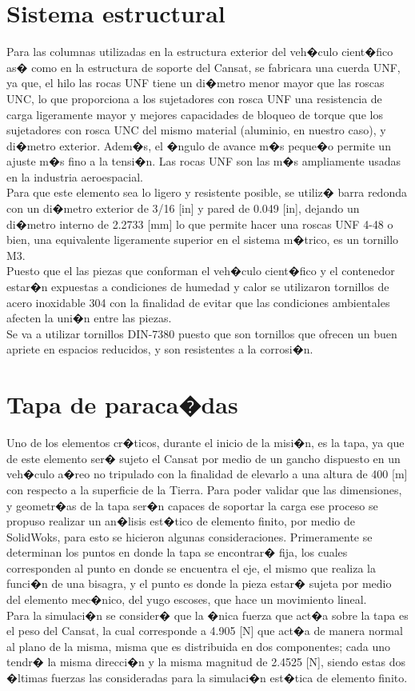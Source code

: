 \documentclass[10pt,a4paper]{book}
\begin{document}
\section*{Sistema estructural}
Para las columnas utilizadas en la estructura exterior del veh�culo cient�fico as� como en la estructura de soporte del Cansat, se fabricara una cuerda UNF, ya que, el hilo las rocas UNF tiene un di�metro menor mayor que las roscas UNC, lo que proporciona a los sujetadores con rosca UNF una resistencia de carga ligeramente mayor y mejores capacidades de bloqueo de torque que los sujetadores con rosca UNC del mismo material (aluminio, en nuestro caso), y di�metro exterior. Adem�s, el �ngulo de avance m�s peque�o permite un ajuste m�s fino a la tensi�n. Las rocas UNF son las m�s ampliamente usadas en la industria aeroespacial. \\
Para que este elemento sea lo ligero y resistente posible, se utiliz� barra redonda con un di�metro exterior de 3/16 [in] y pared de 0.049 [in], dejando un di�metro interno de 2.2733 [mm] lo que permite hacer una roscas UNF 4-48 o bien, una equivalente ligeramente superior en el sistema m�trico, es un tornillo M3.\\
Puesto que el las piezas que conforman el veh�culo cient�fico y el contenedor estar�n expuestas a condiciones de humedad y calor se utilizaron tornillos de acero inoxidable 304 con la finalidad de evitar que las condiciones ambientales afecten la uni�n entre las piezas.\\
Se va a utilizar tornillos DIN-7380 puesto que son tornillos que ofrecen un buen apriete en espacios reducidos, y son resistentes a la corrosi�n.

\section{Tapa de paraca�das}
Uno de los elementos cr�ticos, durante el inicio de la misi�n, es la tapa, ya que de este elemento ser� sujeto el Cansat por medio de un gancho dispuesto en un veh�culo a�reo no tripulado con la finalidad de elevarlo a una altura de 400 [m] con respecto a la superficie de la Tierra. Para poder validar que las dimensiones, y geometr�as de la tapa ser�n capaces de soportar la carga ese proceso se propuso realizar un an�lisis est�tico de elemento finito, por medio de SolidWoks, para esto se hicieron algunas consideraciones. Primeramente se determinan los puntos en donde la tapa se encontrar� fija, los cuales corresponden al punto en donde se encuentra el eje, el mismo que realiza la funci�n de una bisagra, y el punto es donde la pieza estar� sujeta por medio del elemento mec�nico, del yugo escoses, que hace un movimiento lineal.\\

Para la simulaci�n se consider� que la �nica fuerza que act�a sobre la tapa es el peso del Cansat, la cual corresponde a 4.905 [N] que act�a de manera normal al plano de la misma, misma que es distribuida en dos componentes; cada uno tendr� la misma direcci�n y la misma magnitud de 2.4525 [N], siendo estas dos �ltimas fuerzas las consideradas para la simulaci�n est�tica de elemento finito.
\end{document}
